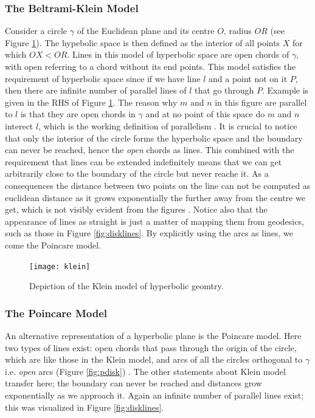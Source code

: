 \documentclass[12pt]{report}
\begin{document}
\subsubsection{The Beltrami-Klein Model}
Consider a circle $\gamma$ of the Euclidean plane and its centre $O$, radius $OR$ (see Figure \ref{fig:klein}). The hypebolic space is then defined as the interior of all points $X$ for which $OX < OR$. Lines in this model of hyperbolic space are open chords of $\gamma$, with open referring to a chord without its end points. This model satisfies the requirement of hyperbolic space since if we have line $l$ and a point not on it $P$, then there are infinite number of parallel lines of $l$ that go through $P$. Example is given in the RHS of Figure \ref{fig:klein}. The reason why $m$ and $n$ in this figure are parallel to $l$ is that they are open chords in $\gamma$ and at no point of this space do $m$ and $n$ interect $l$, which is the working definition of parallelism \cite{Greenberg1994}. It is crucial to notice that only the interior of the circle forms the hyperbolic space and the boundary can never be reached, hence the \textit{open} chords as lines. This combined with the requirement that lines can be extended indefinitely means that we can get arbitrarily close to the boundary of the circle but never reache it. As a consequences the distance between two points on the line can not be computed as euclidean distance as it grows exponentially the further away from the centre we get, which is not visibly evident from the figures \cite{Greenberg1994}. Notice also that the appearance of lines as straight is just a matter of mapping them from geodesics, such as those in Figure \ref{fig:disklines}. By explicitly using the arcs as lines, we come the Poincare model.

\begin{figure}
  \centering
	\texttt{[image: klein]}
	\caption{Depiction of the Klein model of hyperbolic geomtry.}
	\label{fig:klein}
\end{figure}

\subsubsection{The Poincare Model}
An alternative representation of a hyperbolic plane is the Poincare model. Here two types of lines exist: open chords that pass through the origin of the circle, which are like those in the Klein model, and arcs of all the circles orthogonal to $\gamma$ i.e. \textit{open} arcs (Figure \ref{fig:pdisk}) \cite{Greenberg1994}. The other statements about Klein model transfer here; the boundary can never be reached and distances grow exponentially as we approach it. Again an infinite number of parallel lines exist; this was visualized in Figure \ref{fig:disklines}.
\end{document}
